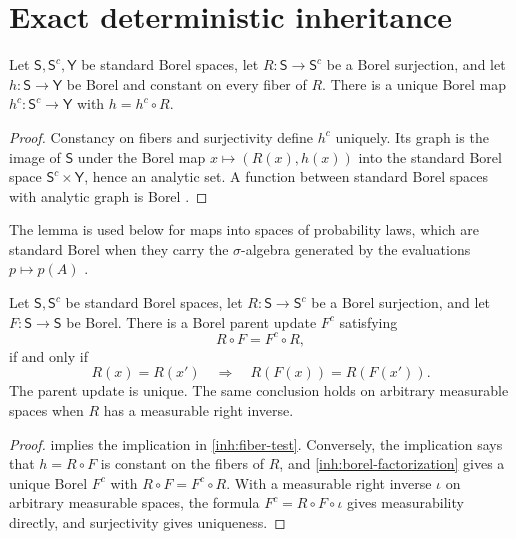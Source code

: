 \section{Exact deterministic inheritance}

Let $\mathsf S,\mathsf S^c,\mathsf Y$ be standard Borel spaces, let
$R:\mathsf S\to\mathsf S^c$ be a Borel surjection, and let
$h:\mathsf S\to\mathsf Y$ be Borel and constant on every fiber of $R$. There
is a unique Borel map $h^c:\mathsf S^c\to\mathsf Y$ with $h=h^c\circ R$.
\begin{proof}
Constancy on fibers and surjectivity define $h^c$ uniquely. Its graph is the
image of $\mathsf S$ under the Borel map $x\mapsto(R(x),h(x))$ into the
standard Borel space $\mathsf S^c\times\mathsf Y$, hence an analytic set. A
function between standard Borel spaces with analytic graph is Borel
\citep[Thm.~14.12]{Kechris1995}.
\end{proof}

The lemma is used below for maps into spaces of probability laws, which are
standard Borel when they carry the $\sigma$-algebra generated by the
evaluations $p\mapsto p(A)$ \citep{Kechris1995}.

Let $\mathsf S,\mathsf S^c$ be standard Borel spaces, let
$R:\mathsf S\to\mathsf S^c$ be a Borel surjection, and let
$F:\mathsf S\to\mathsf S$ be Borel. There is a Borel parent update $F^c$
satisfying
\begin{equation}
 R\circ F=F^c\circ R,
 \label{inh:update-square}
\end{equation}
if and only if
\begin{equation}
 R(x)=R(x')\quad\Longrightarrow\quad R(F(x))=R(F(x')).
 \label{inh:fiber-test}
\end{equation}
The parent update is unique. The same conclusion holds on arbitrary
measurable spaces when $R$ has a measurable right inverse.

\begin{proof}
 implies the implication in
\cref{inh:fiber-test}. Conversely, the implication says that $h=R\circ F$
is constant on the fibers of $R$, and \cref{inh:borel-factorization} gives a
unique Borel $F^c$ with $R\circ F=F^c\circ R$. With a measurable right
inverse $\iota$ on arbitrary measurable spaces, the formula
$F^c=R\circ F\circ\iota$ gives measurability directly, and surjectivity
gives uniqueness.
\end{proof}

